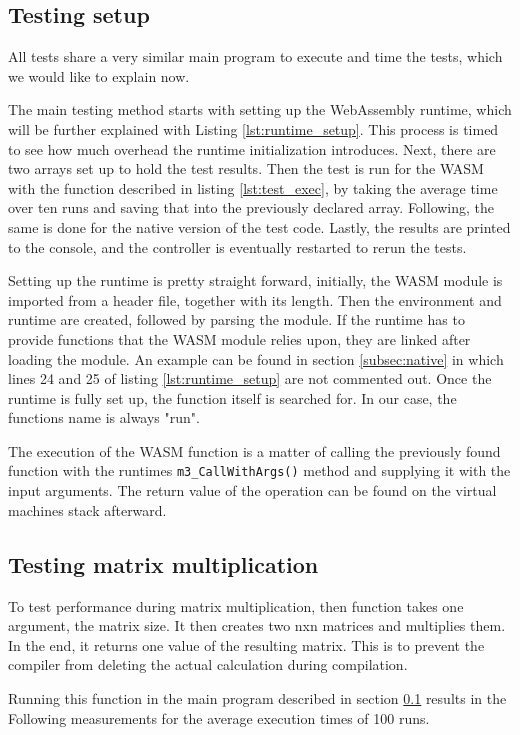 \subsection{Testing setup}\label{subsec:testing_setup}
All tests share a very similar main program to execute and time the tests, which we would like to explain now.

The main testing method starts with setting up the WebAssembly runtime, which will be further explained with Listing \ref{lst:runtime_setup}. This process is timed to see how much overhead the runtime initialization introduces. Next, there are two arrays set up to hold the test results. Then the test is run for the WASM with the function described in listing \ref{lst:test_exec}, by taking the average time over ten runs and saving that into the previously declared array. Following, the same is done for the native version of the test code. Lastly, the results are printed to the console, and the controller is eventually restarted to rerun the tests.

Setting up the runtime is pretty straight forward, initially, the WASM module is imported from a header file, together with its length. Then the environment and runtime are created, followed by parsing the module. If the runtime has to provide functions that the WASM module relies upon, they are linked after loading the module. An example can be found in section \ref{subsec:native} in which lines 24 and 25 of listing \ref{lst:runtime_setup} are not commented out. Once the runtime is fully set up, the function itself is searched for. In our case, the functions name is always "run".

The execution of the WASM function is a matter of calling the previously found function with the runtimes \lstinline{m3_CallWithArgs()} method and supplying it with the input arguments. The return value of the operation can be found on the virtual machines stack afterward.

\subsection{Testing matrix multiplication}
To test performance during matrix multiplication, then function takes one argument, the matrix size. It then creates two nxn matrices and multiplies them. In the end, it returns one value of the resulting matrix. This is to prevent the compiler from deleting the actual calculation during compilation.

Running this function in the main program described in section \ref{subsec:testing_setup} results in the Following measurements for the average execution times of 100 runs.

